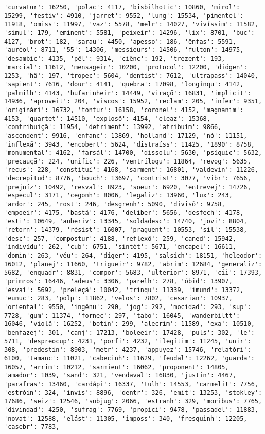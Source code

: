 \documentclass[11pt]{article}
\begin{document}
\begin{Verbatim}[commandchars=\\\{\}]
'curvatur': 16250, 'polac': 4117, 'bisbilhotic': 10860, 'mirol': 15299, 'festiv': 4910, 'jarret': 9552, 'lung': 15534, 'pimentel': 11918, 'omiss': 11997, 'vaz': 5578, 'melr': 14027, 'vivíssim': 11582, 'simul': 179, 'eminent': 5581, 'peixeir': 14296, 'lix': 8701, 'buc': 4127, 'brot': 182, 'sarau': 4450, 'apesso': 186, 'ênfas': 5591, 'auréol': 8711, '55': 14306, 'messieurs': 14506, 'fulton': 14975, 'desambic': 4135, 'pêl': 9314, 'ciênc': 192, 'trezent': 193, 'marcial': 11612, 'mensageir': 10200, 'protocol': 12200, 'diógen': 1253, 'hã': 197, 'tropec': 5604, 'dentist': 7612, 'ultrapass': 14040, 'sapient': 7616, 'dour': 4141, 'quebra': 17098, 'longínqu': 4142, 'palmilh': 4143, 'bufarinheir': 14449, 'viraçõ': 16831, 'implicit': 14936, 'aproveit': 204, 'viscos': 15952, 'reclam': 205, 'infer': 9351, 'originári': 16732, 'tontur': 16158, 'coronel': 4152, 'magnanim': 4153, 'quartet': 14510, 'explosõ': 4154, 'eleaz': 15368, 'contribuiçã': 11954, 'detriment': 13992, 'atribuím': 9866, 'ascendent': 9916, 'enfanc': 13869, 'holland': 17129, 'nó': 11151, 'inflexã': 3943, 'encobert': 5624, 'distraíss': 11425, '1890': 8758, 'monumental': 4162, 'farsál': 14700, 'dissolu': 5630, 'psíquic': 5632, 'precauçã': 224, 'unific': 226, 'ventríloqu': 11864, 'revog': 5635, 'recus': 228, 'constituí': 4168, 'sarment': 16801, 'valdevin': 11226, 'decrepitud': 8776, 'bouch': 13697, 'contrist': 3077, 'vibr': 7656, 'prejuíz': 10492, 'resval': 8923, 'soeur': 6920, 'entrevej': 14726, 'especul': 3171, 'cegonh': 8006, 'legaliz': 13960, 'lux': 243, 'ardor': 245, 'rost': 246, 'desgrenh': 5090, 'divisõ': 9758, 'empoeir': 4175, 'bastã': 4176, 'deliber': 5656, 'desfech': 4178, 'esti': 10649, 'auberiv': 13345, 'soldadesc': 14740, 'jovi': 8804, 'retorn': 14379, 'résist': 16007, 'praguent': 10553, 'sil': 15538, 'desc': 257, 'compostur': 4188, 'reflexõ': 259, 'caned': 15942, 'indivídu': 262, 'cub': 6751, 'sintét': 5671, 'encapel': 16611, 'domin': 263, 'véu': 264, 'diger': 4195, 'salsich': 18151, 'heleodor': 16012, 'planej': 11660, 'trigueir': 9782, 'abrim': 12684, 'generaliz': 5682, 'enquadr': 8831, 'compor': 5683, 'ulterior': 8971, 'cii': 17393, 'primros': 16446, 'adeus': 3306, 'parelh': 278, 'óbid': 13907, 'esvaí': 5692, 'preleçã': 10042, 'trinqu': 11339, 'imund': 13372, 'eunuc': 283, 'polp': 11862, 'velos': 7802, 'cesarian': 10937, 'oriental': 9550, 'ingênu': 290, 'jog': 292, 'mocidad': 293, 'sup': 7728, 'gum': 11374, 'fornec': 297, 'tabo': 16045, 'wanderbiltt': 16046, 'violã': 16252, 'botin': 299, 'alecrim': 11589, 'exa': 10510, 'benfazej': 301, 'canj': 17213, 'boleeir': 17428, 'puls': 302, 'le': 5711, 'despreocup': 4231, 'porfi': 4232, 'ilegítim': 11245, 'unir': 308, 'predestin': 8903, 'metr': 4237, 'appuyez': 15746, 'relatóri': 6100, 'tamanc': 11021, 'cabecinh': 11629, 'feudal': 12262, 'guarda': 16057, 'arrim': 10212, 'sarmient': 16062, 'proponent': 14805, 'amador': 1039, 'sand': 321, 'vendaval': 16830, 'justin': 4467, 'parafras': 13460, 'cardápi': 16337, 'tulh': 14553, 'carmelit': 7756, 'estróin': 324, 'invis': 8896, 'dentr': 326, 'emit': 13253, 'stokley': 17686, 'seiz': 12546, 'subjug': 2066, 'estranh': 329, 'moribus': 7765, 'divindad': 4250, 'sufrag': 7769, 'propíci': 9478, 'passadel': 11883, 'novat': 12588, 'elást': 11305, 'imposs': 340, 'fresquinh': 12205, 'casebr': 7783, 
\end{Verbatim}
\end{document}
